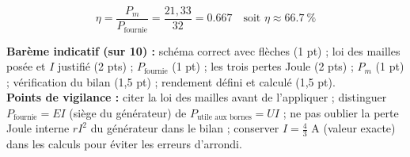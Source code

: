 \documentclass[11pt]{article}
\begin{document}
\begin{corrige}
\begin{enumerate}
\[
\eta = \frac{P_m}{P_{\text{fournie}}} = \frac{21,33}{32} = \num{0,667} \quad \text{soit } \eta \approx \SI{66,7}{\%}
\]
\end{enumerate}
\textbf{Barème indicatif (sur 10) :} schéma correct avec flèches (1 pt) ; loi des mailles posée et $I$ justifié (2 pts) ; $P_{\text{fournie}}$ (1 pt) ; les trois pertes Joule (2 pts) ; $P_m$ (1 pt) ; vérification du bilan (1,5 pt) ; rendement défini et calculé (1,5 pt).\\
\textbf{Points de vigilance :} citer la loi des mailles avant de l'appliquer ; distinguer $P_{\text{fournie}} = E I$ (siège du générateur) de $P_{\text{utile aux bornes}} = U I$ ; ne pas oublier la perte Joule interne $r I^2$ du générateur dans le bilan ; conserver $I = \tfrac{4}{3}$ A (valeur exacte) dans les calculs pour éviter les erreurs d'arrondi.
\end{corrige}
\end{document}
